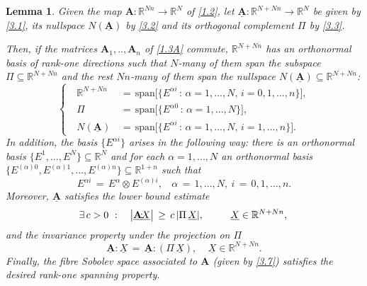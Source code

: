 \documentclass{amsart}
\newtheorem{lemma}[theorem]{Lemma}
\theoremstyle{definition}
\numberwithin{equation}{section}
\begin{document}
\begin{lemma} \label{lemma12} Given the map ${\textbf{A}} : {\mathbb{R}}^{Nn}{\longrightarrow} {\mathbb{R}}^N$ of \eqref{1.2}, let ${\underline{\textbf{A}}} : {\mathbb{R}}^{N+Nn}{\longrightarrow} {\mathbb{R}}^N$ be given by \eqref{3.1}, its nullspace $N({\underline{\textbf{A}}})$ by \eqref{3.2} and its orthogonal complement $\Pi$ by \eqref{3.3}. 

Then, if the matrices ${\textbf{A}}_1,..,{\textbf{A}}_n$ of \eqref{1.3A} commute, ${\mathbb{R}}^{N+Nn}$ has an orthonormal basis of rank-one directions such that $N$-many of them span the subspace $\Pi {\subseteq} {\mathbb{R}}^{N+Nn}$ and the rest $Nn$-many of them span the nullspace $N({\underline{\textbf{A}}}) {\subseteq} {\mathbb{R}}^{N+Nn}$:
\begin{equation} \label{3.10}
\left\{\ \ \ 
\begin{split}
{\mathbb{R}}^{N+Nn} \, &=\, {\textrm{span}}\big[\Big\{E^{{\alpha} i} \, :\, {\alpha}=1,...,N,\, i=0,1,...,n\Big\} \big], \\ 
\Pi \, &=\, {\textrm{span}}\big[\Big\{E^{{\alpha} 0} \, :\, {\alpha}=1,...,N\Big\} \big], \\ 
N({\underline{\textbf{A}}}) \, &=\, {\textrm{span}}\big[\Big\{E^{{\alpha} i} \, :\, {\alpha}=1,...,N,\, i=1,...,n\Big\} \big].
\end{split} 
\right.
\end{equation}
In addition, the basis $\{E^{{\alpha} i}\}$ arises in the following way: there is an orthonormal basis $\{E^1,...,E^N\}{\subseteq} {\mathbb{R}}^N$ and for each ${\alpha}=1,...,N$ an orthonormal basis $\{E^{({\alpha})0}, E^{({\alpha})1},...,E^{({\alpha})n}\}{\subseteq} {\mathbb{R}}^{1+n}$ such that
\begin{equation} \label{3.11}
E^{{\alpha} i} \,= \, E^{\alpha} {\otimes} E^{({\alpha})i},\ \ \ \ {\alpha}\,=\,1,...,N,\ i\,=\,0,1,...,n.
\end{equation}
Moreover, ${\underline{\textbf{A}}}$ satisfies the lower bound estimate
\begin{equation} \label{3.12}
\exists\, c>0\ : \ \ \ \big|{\underline{\textbf{A}}} {\!:\!} \underline{X}\big|\, \geq\, c\, |\Pi\, \underline{X}|,\ \ \ \ \ \ \ \ \underline{X} \in {\mathbb{R}}^{N+Nn},\\
\end{equation}
and the invariance property under the projection on $\Pi$
\begin{equation} \label{3.13}
{\underline{\textbf{A}}} {\!:\!}   \underline{X} \, =\,  {\underline{\textbf{A}}} {\!:\!} (\Pi\, \underline{X}) , \ \ \ \ \ \underline{X} \in {\mathbb{R}}^{N+Nn}.
\end{equation}
Finally, the fibre Sobolev space associated to ${\textbf{A}}$ (given by \eqref{3.7}) satisfies the desired rank-one spanning property. 
\end{lemma}
\end{document}
